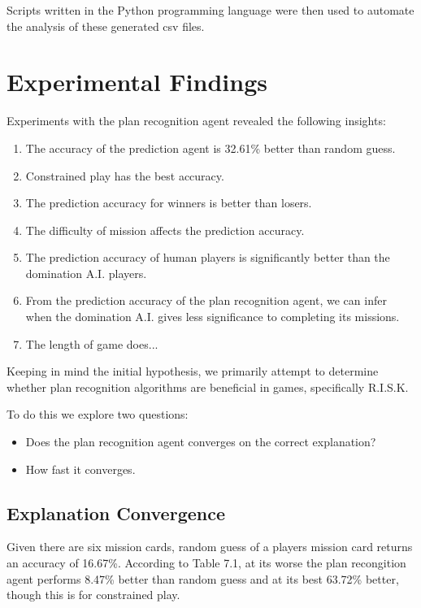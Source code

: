 \documentclass[parskip]{cs4rep}
\begin{document}
Scripts written in the Python programming language were then used to automate the analysis of these generated csv files.

\newpage

\section{Experimental Findings}

Experiments with the plan recognition agent revealed the following insights:

\begin{enumerate}
\item
The accuracy of the prediction agent is 32.61\% better than random guess.
\item
Constrained play has the best accuracy. 
\item
The prediction accuracy for winners is better than losers.
\item
The difficulty of mission affects the prediction accuracy.
\item
The prediction accuracy of human players is significantly better than the domination A.I. players.
\item
From the prediction accuracy of the plan recognition agent, we can infer when the domination A.I. gives less significance to completing its missions.
\item
The length of game does...
\end{enumerate}

Keeping in mind the initial hypothesis, we primarily attempt to determine whether plan recognition algorithms are beneficial in games, specifically R.I.S.K.

To do this we explore two questions:

\begin{itemize}
\item
Does the plan recognition agent converges on the correct explanation?
\item
How fast it converges.
\end{itemize}

\subsection{Explanation Convergence}

Given there are six mission cards, random guess of a players mission card returns an accuracy of 16.67\%. According to Table 7.1, at its worse the plan recongition agent performs 8.47\% better than random guess and at its best 63.72\% better, though this is for constrained play. 
\end{document}

